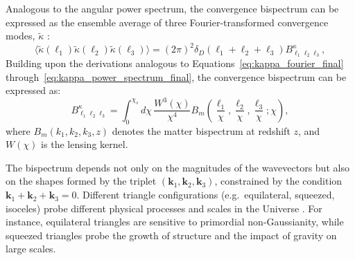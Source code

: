 Analogous to the angular power spectrum, the convergence bispectrum can be expressed as the ensemble average of three Fourier-transformed convergence modes, \( \tilde{\kappa} \) \citep{2005PhRvD..72h3001D}:
\begin{equation}
    \langle \tilde{\kappa}(\mathbf{\ell}_1) \tilde{\kappa}(\mathbf{\ell}_2) \tilde{\kappa}(\mathbf{\ell}_3) \rangle = (2\pi)^2 \delta_{D}(\mathbf{\ell}_1 + \mathbf{\ell}_2 + \mathbf{\ell}_3) B^\kappa_{\ell_1 \ell_2 \ell_3},
    \label{eq:convergence_bispectrum_def}
\end{equation}
Building upon the derivations analogous to Equations~\eqref{eq:kappa_fourier_final} through~\eqref{eq:kappa_power_spectrum_final}, the convergence bispectrum can be expressed as:
\begin{equation}
    B_{\ell_1 \ell_2 \ell_3}^\kappa = \int_0^{\chi_s} d\chi \, \frac{W^3(\chi)}{\chi^4} B_m\left( \frac{\ell_1}{\chi}, \frac{\ell_2}{\chi}, \frac{\ell_3}{\chi}; \chi \right),
    \label{eq:convergence_bispectrum}
\end{equation}
where \( B_m(k_1, k_2, k_3, z) \) denotes the matter bispectrum at redshift \( z \), and \( W(\chi) \) is the lensing kernel. 

The bispectrum depends not only on the magnitudes of the wavevectors but also on the shapes formed by the triplet \( (\boldsymbol{k}_1, \boldsymbol{k}_2, \boldsymbol{k}_3) \), constrained by the condition \( \boldsymbol{k}_1 + \boldsymbol{k}_2 + \boldsymbol{k}_3 = 0 \). Different triangle configurations (e.g.\, equilateral, squeezed, isoceles) probe different physical processes and scales in the Universe \citep{2005PhRvD..72h3001D}. For instance, equilateral triangles are sensitive to primordial non-Gaussianity, while squeezed triangles probe the growth of structure and the impact of gravity on large scales.


